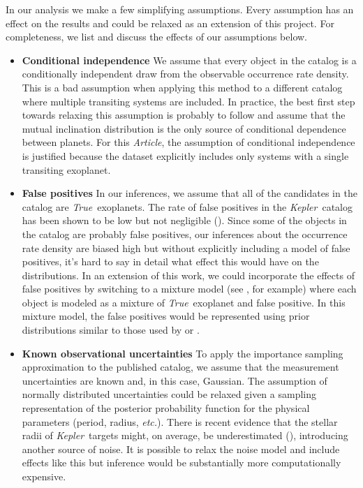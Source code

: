 \documentclass[12pt,preprint]{aastex}
\newcommand{\project}[1]{\emph{#1}}
\newcommand{\kepler}{\project{Kepler}}
\newcommand{\paper}{\textsl{Article}}
\newcommand{\foreign}[1]{\emph{#1}}
\newcommand{\etc}{\foreign{etc.}}
\newcommand{\True}{\foreign{True}}
\begin{document}
In our analysis we make a few simplifying assumptions.
Every assumption has an effect on the results and could be relaxed as an
extension of this project.
For completeness, we list and discuss the effects of our assumptions below.
\begin{itemize}

\item {\bf Conditional independence}\quad
We assume that every object in the catalog is a conditionally independent
draw from the observable occurrence rate density.
This is a bad assumption when applying this method to a different catalog
where multiple transiting systems are included.
In practice, the best first step towards relaxing this assumption is probably
to follow \citet{tremaine} and assume that the mutual inclination distribution
is the only source of conditional dependence between planets.
For this \paper, the assumption of conditional independence is justified
because the dataset explicitly includes only systems with a single transiting
exoplanet.

\item {\bf False positives}\quad
In our inferences, we assume that all of the candidates in the catalog are
\True\ exoplanets.
The rate of false positives in the \kepler\ catalog has been shown to be low
but not negligible (\citealt{morton, fressin-fp}).
Since some of the objects in the catalog are probably false positives, our
inferences about the occurrence rate density are biased high but without
explicitly including a model of false positives, it's hard to say in detail
what effect this would have on the distributions.
In an extension of this work, we could incorporate the effects of false
positives by switching to a mixture model (see \citealt{hogg-line}, for
example) where each object is modeled as a mixture of \True\ exoplanet and
false positive.
In this mixture model, the false positives would be represented using prior
distributions similar to those used by \citet{morton-fp} or
\citet{fressin-fp}.

\item {\bf Known observational uncertainties}\quad
To apply the importance sampling approximation to the published catalog, we
assume that the measurement uncertainties are known and, in this case,
Gaussian.
The assumption of normally distributed uncertainties could be relaxed given
a sampling representation of the posterior probability function for the
physical parameters (period, radius, \etc).
There is recent evidence that the stellar radii of \kepler\ targets might, on
average, be underestimated (\citealt{bastien}), introducing another source of
noise.
It is possible to relax the noise model and include effects like this but
inference would be substantially more computationally expensive.


\end{itemize}
\end{document}
